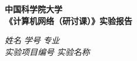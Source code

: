 \begin{center}
  \LARGE \bf 中国科学院大学 \\《计算机网络（研讨课）》实验报告
\end{center}

\begin{center}
  \emph{姓名} \underline{\makebox[7em][c]{\name}} 
  \emph{学号} \underline{\makebox[12em][c]{\studentNum}}
  \emph{专业} \underline{\makebox[15em][c]{\major}}\\
  \emph{实验项目编号} \underline{\makebox[3em][c]{\labNum}}
  \emph{实验名称} \underline{\makebox[30em][c]{\labName}}\\
\end{center}




  